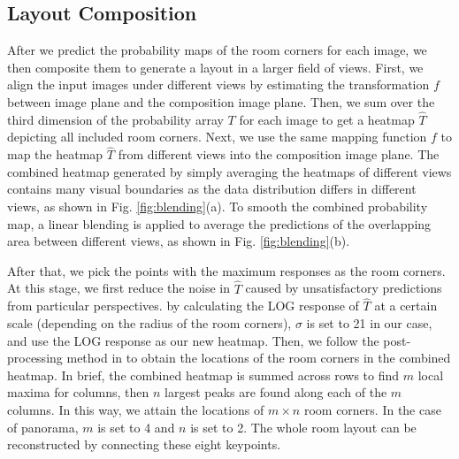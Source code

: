 

\subsection{Layout Composition}
\label{sec:merging}
After we predict the probability maps of the room corners for each image, we then composite them to generate a layout in a larger field of views. 
First, we align the input images under different views by estimating the transformation $f$ between image plane and the composition image plane. 
Then, we sum over the third dimension  of the probability array $T$ for each image to get a heatmap $\hat{T}$ depicting all included room corners. 
Next, we use the same mapping function $f$ to map the heatmap $\hat{T}$ from different views into the composition image plane.
%
The combined heatmap generated by simply averaging the heatmaps of different views contains many visual boundaries as the data distribution differs in different views, as shown in Fig. \ref{fig:blending}(a). To smooth the combined probability map, a linear blending  is applied to average the predictions of the overlapping area between different views, as shown in Fig. \ref{fig:blending}(b). 

%
After that, we pick the points with the maximum responses as the room corners. 
At this stage, we first reduce the noise in $\hat{T}$ caused by unsatisfactory predictions from particular perspectives.  
by calculating the LOG response of $\hat{T}$ at a certain scale (depending on the radius of the room corners), $\sigma$ is set to 21 in our case, and use the LOG response as our new heatmap.
%
Then, we follow the post-processing method in \cite{zou2018layoutnet} to obtain the locations of the room corners in the combined heatmap. In brief, the combined heatmap is summed across rows to find $m$ local maxima for columns, then $n$ largest peaks are found along each of the $m$ columns. In this way, we attain the locations of $m \times n$ room corners. In the case of panorama, $m$ is set to 4 and $n$ is set to 2. The whole room layout can be reconstructed by connecting these eight keypoints. 




